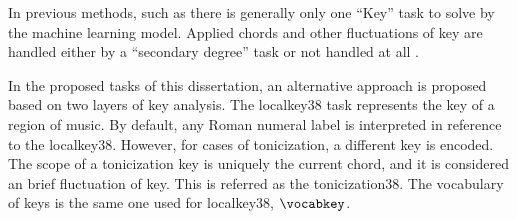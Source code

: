 
In previous methods, such as \textcite{chen2018functional,
chen2019harmony, micchi2020not, micchi2021deep,
mcleod2021modular} there is generally only one ``Key'' task
to solve by the machine learning model. Applied chords and
other fluctuations of key are handled either by a
``secondary degree'' task \parencite{chen2021attend,
micchi2021deep} or not handled at all
\parencite{mcleod2021modular}.

In the proposed tasks of this dissertation, an alternative
approach is proposed based on two layers of key analysis.
The \gls{localkey38} task represents the key of a region of
music. By default, any Roman numeral label is interpreted in
reference to the \gls{localkey38}. However, for cases of
tonicization, a different key is encoded. The scope of a
tonicization key is uniquely the current chord, and it is
considered an brief fluctuation of key. This is referred as
the \gls{tonicization38}. The vocabulary of keys is the same
one used for \gls{localkey38}, $\vocabkey$.

